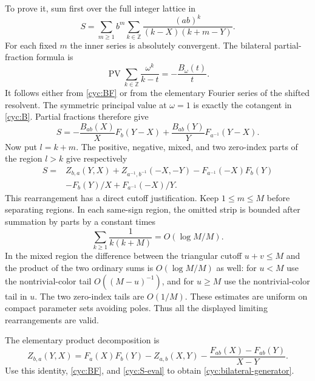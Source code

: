 To prove it, sum first over the full integer lattice in
\[
 S=\sum_{m\ge1}b^m\sum_{k\in\mathbb Z}
       \frac{(ab)^k}{(k-X)(k+m-Y)}.
\]
For each fixed $m$ the inner series is absolutely convergent.  The
bilateral partial-fraction formula is
\[
 \operatorname{PV}\sum_{k\in\mathbb Z}\frac{\omega^k}{k-t}
                  =-\frac{B_\omega(t)}t.
\]
It follows either from \eqref{cyc:BF} or from the elementary
Fourier series of the shifted resolvent.  The symmetric principal
value at $\omega=1$ is exactly the cotangent in \eqref{cyc:B}.
Partial fractions therefore give
\begin{equation}\label{cyc:S-eval}
 S=-\frac{B_{ab}(X)}X F_b(Y-X)
                  +\frac{B_{ab}(Y)}YF_{a^{-1}}(Y-X).
\end{equation}
Now put $l=k+m$.  The positive, negative, mixed, and two zero-index
parts of the region $l>k$ give respectively
\begin{align*}
 S={}&Z_{b,a}(Y,X)+Z_{a^{-1},b^{-1}}(-X,-Y)
       -F_{a^{-1}}(-X)F_b(Y)\\
    &-F_b(Y)/X+F_{a^{-1}}(-X)/Y.
\end{align*}
This rearrangement has a direct cutoff justification.  Keep
$1\le m\le M$ before separating regions.  In each same-sign region,
the omitted strip is bounded after summation by parts by a constant
times
\[
 \sum_{k\ge1}\frac1{k(k+M)}=O(\log M/M).
\]
In the mixed region the difference between the triangular cutoff
$u+v\le M$ and the product of the two ordinary sums is
$O(\log M/M)$ as well: for $u<M$ use the nontrivial-color tail
$O((M-u)^{-1})$, and for $u\ge M$ use the nontrivial-color tail in
$u$.  The two zero-index tails are $O(1/M)$.  These estimates are
uniform on compact parameter sets avoiding poles.  Thus all the
displayed limiting rearrangements are valid.

The elementary product decomposition is
\[
 Z_{b,a}(Y,X)=F_a(X)F_b(Y)-Z_{a,b}(X,Y)
                    -\frac{F_{ab}(X)-F_{ab}(Y)}{X-Y}.
\]
Use this identity, \eqref{cyc:BF}, and \eqref{cyc:S-eval} to obtain
\eqref{cyc:bilateral-generator}.

